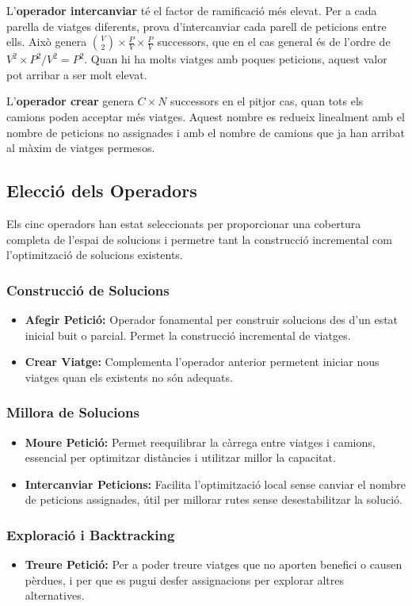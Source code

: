 \vspace{0.5em}
L'\textbf{operador intercanviar} té el factor de ramificació més elevat. Per a cada parella de viatges diferents, prova d'intercanviar cada parell de peticions entre ells. Això genera $\binom{V}{2} \times \frac{P}{V} \times \frac{P}{V}$ successors, que en el cas general és de l'ordre de $V^2 \times P^2 / V^2 = P^2$. Quan hi ha molts viatges amb poques peticions, aquest valor pot arribar a ser molt elevat.

\vspace{0.5em}
L'\textbf{operador crear} genera $C \times N$ successors en el pitjor cas, quan tots els camions poden acceptar més viatges. Aquest nombre es redueix linealment amb el nombre de peticions no assignades i amb el nombre de camions que ja han arribat al màxim de viatges permesos.
\subsection{Elecció dels Operadors}

Els cinc operadors han estat seleccionats per proporcionar una cobertura completa de l'espai de solucions i permetre tant la construcció incremental com l'optimització de solucions existents.

\subsubsection{Construcció de Solucions}
\begin{itemize}
    \item \textbf{Afegir Petició:} Operador fonamental per construir solucions des d'un estat inicial buit o parcial. Permet la construcció incremental de viatges.
    \item \textbf{Crear Viatge:} Complementa l'operador anterior permetent iniciar nous viatges quan els existents no són adequats.
\end{itemize}

\subsubsection{Millora de Solucions}
\begin{itemize}
    \item \textbf{Moure Petició:} Permet reequilibrar la càrrega entre viatges i camions, essencial per optimitzar distàncies i utilitzar millor la capacitat.
    \item \textbf{Intercanviar Peticions:} Facilita l'optimització local sense canviar el nombre de peticions assignades, útil per millorar rutes sense desestabilitzar la solució.
\end{itemize}

\subsubsection{Exploració i Backtracking}
\begin{itemize}
    \item \textbf{Treure Petició:} Per a poder treure viatges que no aporten benefici o causen pèrdues, i per que es pugui desfer assignacions per explorar altres alternatives.
\end{itemize}

